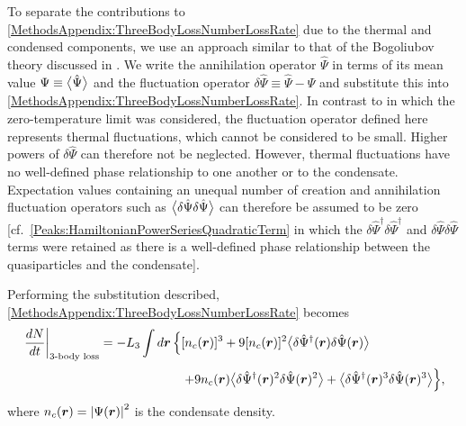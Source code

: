 To separate the contributions to \eqref{MethodsAppendix:ThreeBodyLossNumberLossRate} due to the thermal and condensed components, we use an approach similar to that of the Bogoliubov theory discussed in .  We write the annihilation operator $\hat{\Psi}$ in terms of its mean value $\Psi \equiv {\ensuremath{\big<\hat{\Psi}\big>}}$ and the fluctuation operator $\delta \hat{\Psi} \equiv \hat{\Psi} - \Psi$ and substitute this into \eqref{MethodsAppendix:ThreeBodyLossNumberLossRate}.  In contrast to  in which the zero-temperature limit was considered, the fluctuation operator defined here represents thermal fluctuations, which cannot be considered to be small.  Higher powers of $\delta\hat{\Psi}$ can therefore not be neglected.  However, thermal fluctuations have no well-defined phase relationship to one another or to the condensate.  Expectation values containing an unequal number of creation and annihilation fluctuation operators such as ${\big<\delta\hat{\Psi}\delta\hat{\Psi}\big>}$ can therefore be assumed to be zero [cf.\ \eqref{Peaks:HamiltonianPowerSeriesQuadraticTerm} in which the $\delta\hat{\Psi}^\dagger \delta\hat{\Psi}^\dagger$ and $\delta\hat{\Psi}\delta\hat{\Psi}$ terms were retained as there is a well-defined phase relationship between the quasiparticles and the condensate].

Performing the substitution described, \eqref{MethodsAppendix:ThreeBodyLossNumberLossRate} becomes
\begin{align}
    \begin{split}
        \left.\frac{d N}{dt} \right|_\text{3-body loss} &=  -L_3 \int d \vect{r}\, \Big\{[n_c(\vect{r})]^3 + 9 [n_c(\vect{r})]^2 \mean{\delta\hat{\Psi}^\dagger(\vect{r}) \delta\hat{\Psi}(\vect{r})}\\
        &\relphantom{=-L_3 \int d \vect{r}\,\Big\{} + 9 n_c(\vect{r}) \mean{\delta\hat{\Psi}^\dagger(\vect{r})^2 \delta\hat{\Psi}(\vect{r})^2} + \mean{\delta\hat{\Psi}^\dagger(\vect{r})^3 \delta\hat{\Psi}(\vect{r})^3}\Big\},
    \end{split}
    \label{MethodsAppendix:ThreeBodyLossNumberLossRateInTermsOfFluctuationOperators}
\end{align}
where $n_c(\bm{r}) = \left|\Psi(\bm{r})\right|^2$ is the condensate density.

